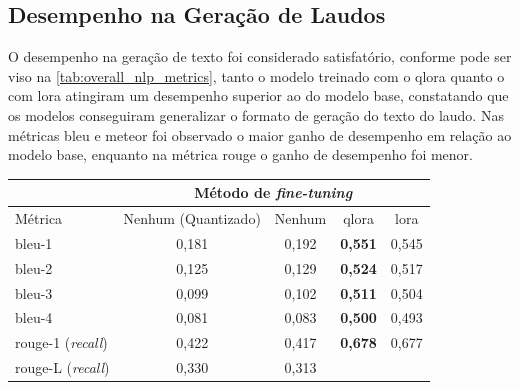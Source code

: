 \subsection{Desempenho na Geração de Laudos}

O desempenho na geração de texto foi considerado satisfatório, conforme pode ser viso na
\autoref{tab:overall_nlp_metrics}, tanto o modelo treinado com o \ac{qlora} quanto o com \ac{lora} atingiram um
desempenho superior ao do modelo base, constatando que os modelos conseguiram generalizar o formato de geração do texto
do laudo. Nas métricas \ac{bleu} e \ac{meteor} foi observado o maior ganho de desempenho em relação ao modelo base,
enquanto na métrica \ac{rouge} o ganho de desempenho foi menor.

\begin{table}[ht]
    \centering
    \begin{tabular}{l|c|c|c|c}
        \hline
                                       & \multicolumn{4}{c}{Método de \textit{fine-tuning}}
        \\ \hline
        Métrica                        & Nenhum (Quantizado)
                                       & Nenhum                                             & \ac{qlora}
                                       & \ac{lora}
        \\ \hline
        \ac{bleu}-1                    & 0,181                                              & 0,192      &
        \textbf{0,551}
                                       & 0,545
        \\
        \ac{bleu}-2                    & 0,125                                              & 0,129      &
        \textbf{0,524}
                                       & 0,517
        \\
        \ac{bleu}-3                    & 0,099                                              & 0,102      &
        \textbf{0,511}
                                       & 0,504
        \\
        \ac{bleu}-4                    & 0,081                                              & 0,083      &
        \textbf{0,500}
                                       & 0,493
        \\
        \hline
        \ac{rouge}-1 (\textit{recall}) & 0,422                                              & 0,417      &
        \textbf{0,678}
                                       & 0,677
        \\
        \ac{rouge}-L (\textit{recall}) & 0,330                                              & 0,313      &

\end{tabular}
\end{table}
